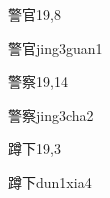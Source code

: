 \begin{entry}{警官}{19,8}
  \begin{phonetics}{警官}{jing3guan1}
  \end{phonetics}
\end{entry}

\begin{entry}{警察}{19,14}
  \begin{phonetics}{警察}{jing3cha2}
  \end{phonetics}
\end{entry}

\begin{entry}{蹲下}{19,3}
  \begin{phonetics}{蹲下}{dun1xia4}
  \end{phonetics}
\end{entry}


